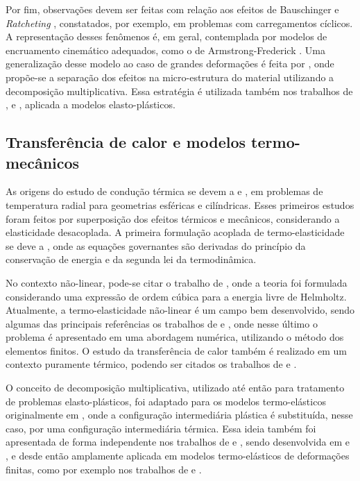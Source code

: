 \documentclass[Tese.tex]{subfiles}
\begin{document}
Por fim, observações devem ser feitas com relação aos efeitos de Bauschinger e \emph{Ratcheting} \cite{CHABOCHE1986149,MOLLICA20011119,OLIVEIRA2007516}, constatados, por exemplo, em problemas com carregamentos cíclicos. A representação desses fenômenos é, em geral, contemplada por modelos de encruamento cinemático adequados, como o de Armstrong-Frederick \cite{armstrong1966mathematical}. Uma generalização desse modelo ao caso de grandes deformações é feita por , onde propõe-se a separação dos efeitos na micro-estrutura do material utilizando a decomposição multiplicativa. Essa estratégia é utilizada também nos trabalhos de ,  e , aplicada a modelos elasto-plásticos.


\subsection{Transferência de calor e modelos termo-mecânicos}

As origens do estudo de condução térmica se devem a  e , em problemas de temperatura radial para geometrias esféricas e cilíndricas. Esses primeiros estudos foram feitos por superposição dos efeitos térmicos e mecânicos, considerando a elasticidade desacoplada. A primeira formulação acoplada de termo-elasticidade se deve a , onde as equações governantes são derivadas do princípio da conservação de energia e da segunda lei da termodinâmica. 

No contexto não-linear, pode-se citar o trabalho de , onde a teoria foi formulada considerando uma expressão de ordem cúbica para a energia livre de Helmholtz. Atualmente, a termo-elasticidade não-linear é um campo bem desenvolvido, sendo algumas das principais referências os trabalhos de  e , onde nesse último o problema é apresentado em uma abordagem numérica, utilizando o método dos elementos finitos. O estudo da transferência de calor também é realizado em um contexto puramente térmico, podendo ser citados os trabalhos de  e .

O conceito de decomposição multiplicativa, utilizado até então para tratamento de problemas elasto-plásticos, foi adaptado para os modelos termo-elásticos originalmente em , onde a configuração intermediária plástica é substituída, nesse caso, por uma configuração intermediária térmica. Essa ideia também foi apresentada de forma independente nos trabalhos de  e , sendo desenvolvida em  e , e desde então amplamente aplicada em modelos termo-elásticos de deformações finitas, como por exemplo nos trabalhos de  e . 
\end{document}

